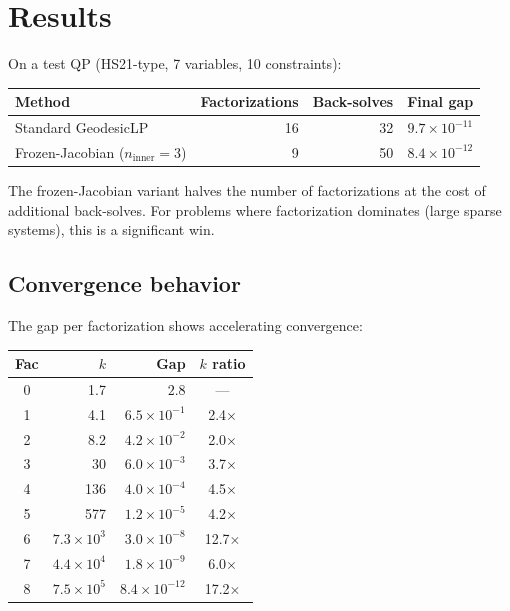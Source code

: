 \documentclass{article}
\begin{document}
\section{Results}

On a test QP (HS21-type, 7 variables, 10 constraints):

\begin{center}
\begin{tabular}{lrrr}
\toprule
Method & Factorizations & Back-solves & Final gap \\
\midrule
Standard GeodesicLP & 16 & 32 & $9.7 \times 10^{-11}$ \\
Frozen-Jacobian ($n_{\text{inner}}=3$) & 9 & 50 & $8.4 \times 10^{-12}$ \\
\bottomrule
\end{tabular}
\end{center}

The frozen-Jacobian variant halves the number of factorizations at
the cost of additional back-solves.  For problems where factorization
dominates (large sparse systems), this is a significant win.

\subsection{Convergence behavior}

The gap per factorization shows accelerating convergence:

\begin{center}
\begin{tabular}{crrc}
\toprule
Fac & $k$ & Gap & $k$ ratio \\
\midrule
0 & 1.7 & $2.8$ & --- \\
1 & 4.1 & $6.5 \times 10^{-1}$ & 2.4$\times$ \\
2 & 8.2 & $4.2 \times 10^{-2}$ & 2.0$\times$ \\
3 & 30 & $6.0 \times 10^{-3}$ & 3.7$\times$ \\
4 & 136 & $4.0 \times 10^{-4}$ & 4.5$\times$ \\
5 & 577 & $1.2 \times 10^{-5}$ & 4.2$\times$ \\
6 & $7.3\times10^3$ & $3.0 \times 10^{-8}$ & 12.7$\times$ \\
7 & $4.4\times10^4$ & $1.8 \times 10^{-9}$ & 6.0$\times$ \\
8 & $7.5\times10^5$ & $8.4 \times 10^{-12}$ & 17.2$\times$ \\
\bottomrule
\end{tabular}
\end{center}
\end{document}
